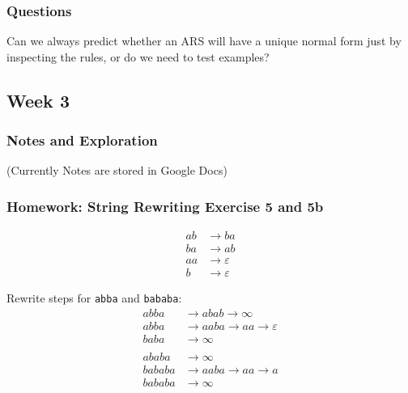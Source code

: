 \documentclass{article}
\theoremstyle{theorem}
\theoremstyle{definition}
\theoremstyle{remark}
\begin{document}
\subsubsection{Questions}
Can we always predict whether an ARS will have a unique normal form just by inspecting the rules, or do we need to test examples?

\subsection{Week 3}

\subsubsection{Notes and Exploration}
(Currently Notes are stored in Google Docs)

\subsubsection{Homework: String Rewriting Exercise 5 and 5b}
\[
\begin{aligned}
  ab &\to ba \\
  ba &\to ab \\
  aa &\to \varepsilon \\
  b  &\to \varepsilon
\end{aligned}
\]

Rewrite steps for \texttt{abba} and \texttt{bababa}: 
\[
\begin{aligned}
  abba &\to abab \to \infty \\
  abba &\to aaba \to aa \to \varepsilon \\
  baba &\to \infty \\
    \\
  ababa &\to \infty \\
  bababa &\to aaba \to aa \to a \\
  bababa &\to \infty
\end{aligned}
\]
\end{document}
